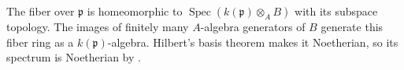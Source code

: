 The fiber over $\mathfrak{p}$ is homeomorphic to $\operatorname{Spec}(k(\mathfrak{p})\otimes_A B)$ with its subspace topology. The images of finitely many $A$-algebra generators of $B$ generate this fiber ring as a $k(\mathfrak{p})$-algebra. Hilbert's basis theorem makes it Noetherian, so its spectrum is Noetherian by .
